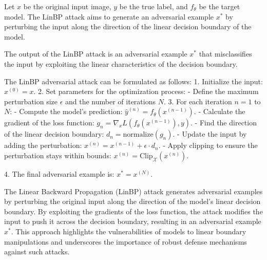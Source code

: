 Let \( x \) be the original input image, \( y \) be the true label, and \( f_{\theta} \) be the target model. The LinBP attack aims to generate an adversarial example \( x^* \) by perturbing the input along the direction of the linear decision boundary of the model.

The output of the LinBP attack is an adversarial example \( x^* \) that misclassifies the input by exploiting the linear characteristics of the decision boundary.

The LinBP adversarial attack can be formulated as follows:
1. Initialize the input:
   $
   x^{(0)} = x.
   $
2. Set parameters for the optimization process:
   - Define the maximum perturbation size \( \epsilon \) and the number of iterations \( N \).
3. For each iteration \( n = 1 \) to \( N \):
   - Compute the model's prediction:
   $
   \hat{y}^{(n)} = f_{\theta}(x^{(n-1)}).
   $
   - Calculate the gradient of the loss function:
   $
   g_n = \nabla_x L(f_{\theta}(x^{(n-1)}), y).
   $
   - Find the direction of the linear decision boundary:
   $
   d_n = \text{normalize}(g_n).
   $
   - Update the input by adding the perturbation:
   $
   x^{(n)} = x^{(n-1)} + \epsilon \cdot d_n.
   $
   - Apply clipping to ensure the perturbation stays within bounds:
   $
   x^{(n)} = \text{Clip}_{\mathcal{X}}(x^{(n)}).
   $

4. The final adversarial example is:
   $
   x^* = x^{(N)}.
   $

The Linear Backward Propagation (LinBP) attack generates adversarial examples by perturbing the original input along the direction of the model's linear decision boundary. By exploiting the gradients of the loss function, the attack modifies the input to push it across the decision boundary, resulting in an adversarial example \( x^* \). This approach highlights the vulnerabilities of models to linear boundary manipulations and underscores the importance of robust defense mechanisms against such attacks.
